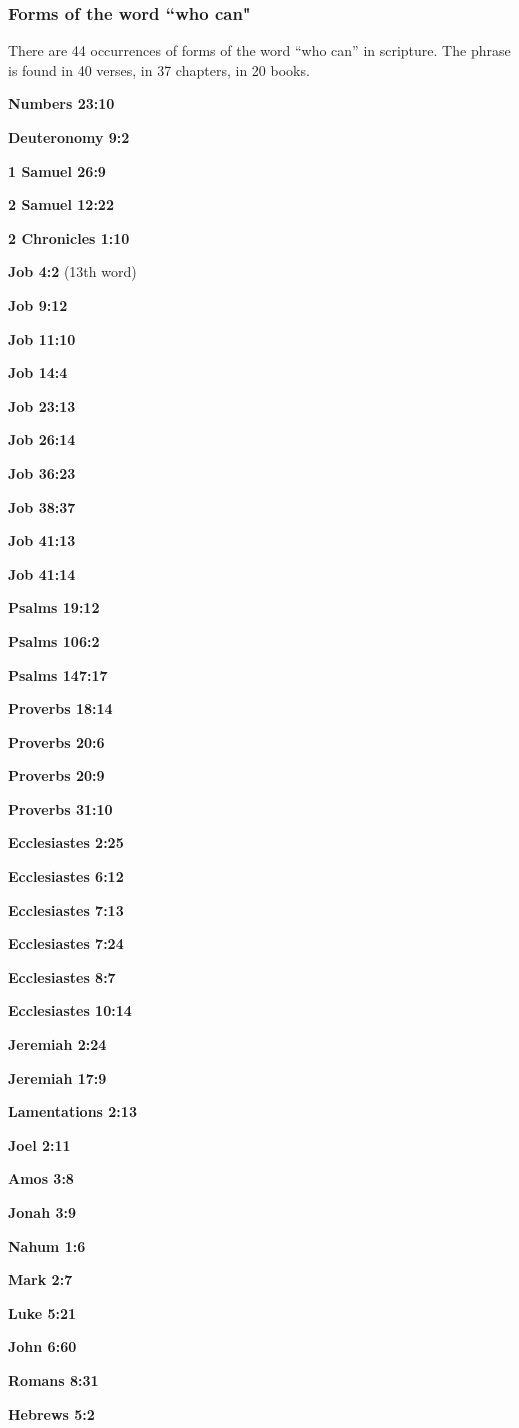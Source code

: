 \subsubsection{Forms of the word ``who can"}
There are 44 occurrences of forms of the word ``who can'' in scripture. The phrase is found in 40 verses, in 37 chapters, in 20 books.
\begin{compactenum}
    \item \textbf{Numbers 23:10}
    \item \textbf{Deuteronomy 9:2}
    \item \textbf{1 Samuel 26:9}
    \item \textbf{2 Samuel 12:22}
    \item \textbf{2 Chronicles 1:10}
    \item \textbf{Job 4:2} (13th word)
    \item \textbf{Job 9:12}
    \item \textbf{Job 11:10}
    \item \textbf{Job 14:4}
    \item \textbf{Job 23:13}
    \item \textbf{Job 26:14}
    \item \textbf{Job 36:23}
    \item \textbf{Job 38:37}
    \item \textbf{Job 41:13}
    \item \textbf{Job 41:14}
    \item \textbf{Psalms 19:12}
    \item \textbf{Psalms 106:2}
    \item \textbf{Psalms 147:17}
    \item \textbf{Proverbs 18:14}
    \item \textbf{Proverbs 20:6}
    \item \textbf{Proverbs 20:9}
    \item \textbf{Proverbs 31:10}
    \item \textbf{Ecclesiastes 2:25}
    \item \textbf{Ecclesiastes 6:12}
    \item \textbf{Ecclesiastes 7:13}
    \item \textbf{Ecclesiastes 7:24}
    \item \textbf{Ecclesiastes 8:7}
    \item \textbf{Ecclesiastes 10:14}
    \item \textbf{Jeremiah 2:24}
    \item \textbf{Jeremiah 17:9}
    \item \textbf{Lamentations 2:13}
    \item \textbf{Joel 2:11}
    \item \textbf{Amos 3:8}
    \item \textbf{Jonah 3:9}
    \item \textbf{Nahum 1:6}
    \item \textbf{Mark 2:7}
    \item \textbf{Luke 5:21}
    \item \textbf{John 6:60}
    \item \textbf{Romans 8:31}
    \item \textbf{Hebrews 5:2}
\end{compactenum}

